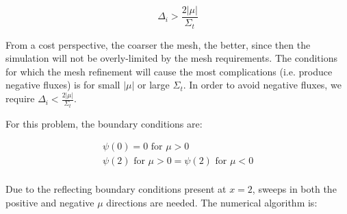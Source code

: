 \documentclass[10pt]{article}
\newcommand*\circled[1]{\tikz[baseline=(char.base)]{
            \node[shape=circle,draw,inner sep=2pt] (char) {#1};}}
\begin{document}
\begin{equation}
\Delta_i>\frac{2|\mu|}{\Sigma_t}
\end{equation}

From a cost perspective, the coarser the mesh, the better, since then the simulation will not be overly-limited by the mesh requirements. The conditions for which the mesh refinement will cause the most complications (i.e. produce negative fluxes) is for small \(|\mu|\) or large \(\Sigma_t\). In order to avoid negative fluxes, we require \(\Delta_i<\frac{2|\mu|}{\Sigma_t}\).\newline 

\circled{3} For this problem, the boundary conditions are:

\begin{equation}
\begin{aligned}
\psi(0)=0 \text{ for } \mu>0\\
\psi(2) \text{ for } \mu>0 = \psi(2) \text{ for } \mu<0\\
\end{aligned}
\end{equation}

Due to the reflecting boundary conditions present at \(x=2\), sweeps in both the positive and negative \(\mu\) directions are needed. The numerical algorithm is:
\end{document}
